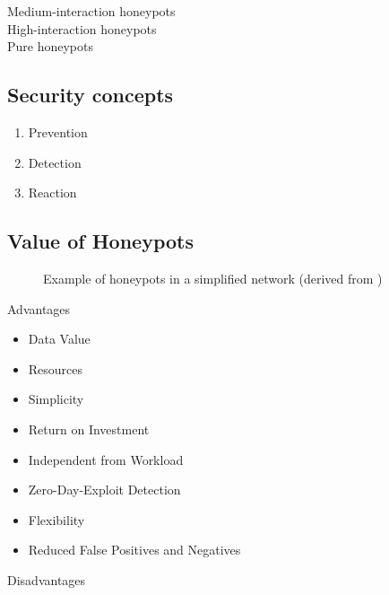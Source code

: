 Medium-interaction honeypots\\

High-interaction honeypots\\

Pure honeypots\\

\subsection{Security concepts}
\label{subsec:honeypot-security-concept}


\begin{enumerate}
    \item Prevention
    \item Detection
    \item Reaction
\end{enumerate}

\cite{NawrockiWSKS2016}

\subsection{Value of Honeypots}

\begin{figure}[h]
    \centering
    
    \caption{Example of honeypots in a simplified network (derived from \cite{Spitzner2003})}
    \label{fig:honeypot-example}
\end{figure}

Advantages

\begin{itemize}
    \item Data Value
    \item Resources
    \item Simplicity
    \item Return on Investment
\end{itemize}

\begin{itemize}
    \item Independent from Workload
    \item Zero-Day-Exploit Detection
    \item Flexibility
    \item Reduced False Positives and Negatives
\end{itemize}

Disadvantages

